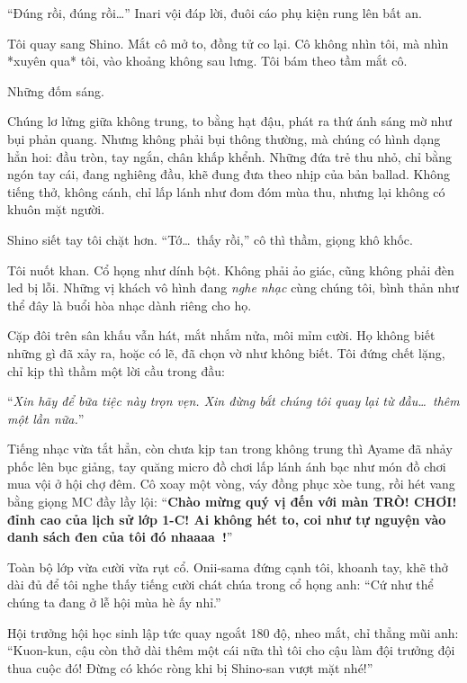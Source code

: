 \documentclass[../main.tex]{subfiles}
\begin{document}
``Đúng rồi, đúng rồi\dots'' Inari vội đáp lời, đuôi cáo phụ kiện rung lên bất an.

Tôi quay sang Shino. Mắt cô mở to, đồng tử co lại. Cô không nhìn tôi, mà nhìn *xuyên qua* tôi, vào khoảng không sau lưng. Tôi bám theo tầm mắt cô.

Những đốm sáng.

Chúng lơ lửng giữa không trung, to bằng hạt đậu, phát ra thứ ánh sáng mờ như bụi phản quang. Nhưng không phải bụi thông thường, mà chúng có hình dạng hẳn hoi: đầu tròn, tay ngắn, chân khấp khểnh. Những đứa trẻ thu nhỏ, chỉ bằng ngón tay cái, đang nghiêng đầu, khẽ đung đưa theo nhịp của bản ballad. Không tiếng thở, không cánh, chỉ lấp lánh như đom đóm mùa thu, nhưng lại không có khuôn mặt người.

Shino siết tay tôi chặt hơn. ``Tớ\dots\ thấy rồi,'' cô thì thầm, giọng khô khốc.

Tôi nuốt khan. Cổ họng như dính bột. Không phải ảo giác, cũng không phải đèn led bị lỗi. Những vị khách vô hình đang \emph{nghe nhạc} cùng chúng tôi, bình thản như thể đây là buổi hòa nhạc dành riêng cho họ.

Cặp đôi trên sân khấu vẫn hát, mắt nhắm nửa, môi mỉm cười. Họ không biết những gì đã xảy ra, hoặc có lẽ,  đã chọn vờ như không biết. Tôi đứng chết lặng, chỉ kịp thì thầm một lời cầu trong đầu:

\begin{center}
  ``\textit{Xin hãy để bữa tiệc này trọn vẹn.
    Xin đừng bắt chúng tôi quay lại từ đầu\dots\ thêm một lần nữa.}''
\end{center}

\ct

Tiếng nhạc vừa tắt hẳn, còn chưa kịp tan trong không trung thì Ayame đã nhảy phốc lên bục giảng, tay quăng micro đồ chơi lấp lánh ánh bạc như món đồ chơi mua vội ở hội chợ đêm. Cô xoay một vòng, váy đồng phục xòe tung, rồi hét vang bằng giọng MC đầy lầy lội: ``\textbf{Chào mừng quý vị đến với màn TRÒ! CHƠI! đỉnh cao của lịch sử lớp 1-C! Ai không hét to, coi như tự nguyện vào danh sách đen của tôi đó nhaaaa~!}''

Toàn bộ lớp vừa cười vừa rụt cổ. Onii-sama đứng cạnh tôi, khoanh tay, khẽ thở dài đủ để tôi nghe thấy tiếng cười chát chúa trong cổ họng anh: ``Cứ như thể chúng ta đang ở lễ hội mùa hè ấy nhỉ.''

Hội trưởng hội học sinh lập tức quay ngoắt 180 độ, nheo mắt, chỉ thẳng mũi anh: ``Kuon-kun, cậu còn thở dài thêm một cái nữa thì tôi cho cậu làm đội trưởng đội thua cuộc đó! Đừng có khóc ròng khi bị Shino-san vượt mặt nhé!''
\end{document}
